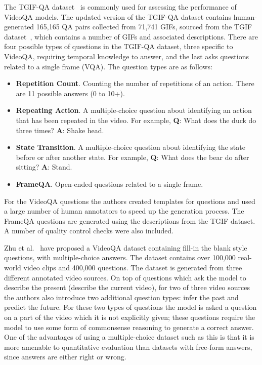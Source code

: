 \documentclass[../interim.tex]{subfiles}
\begin{document}
The TGIF-QA dataset~\cite{dataset:tgif-qa} is commonly used for assessing the performance of VideoQA models. The updated version of the TGIF-QA dataset contains human-generated 165,165 QA pairs collected from 71,741 GIFs, sourced from the TGIF dataset~\cite{dataset:tgif}, which contains a number of GIFs and associated descriptions. There are four possible types of questions in the TGIF-QA dataset, three specific to VideoQA, requiring temporal knowledge to answer, and the last asks questions related to a single frame (VQA). The question types are as follows:
\begin{itemize}
  \item \textbf{Repetition Count}. Counting the number of repetitions of an action. There are 11 possible answers (0 to 10+).

  \item \textbf{Repeating Action}. A multiple-choice question about identifying an action that has been repeated in the video. For example, \textbf{Q}: What does the duck do three times? \textbf{A}: Shake head.

  \item \textbf{State Transition}. A multiple-choice question about identifying the state before or after another state. For example, \textbf{Q}: What does the bear do after sitting? \textbf{A}: Stand.

  \item \textbf{FrameQA}. Open-ended questions related to a single frame.
\end{itemize}

For the VideoQA questions the authors created templates for questions and used a large number of human annotators to speed up the generation process. The FrameQA questions are generated using the descriptions from the TGIF dataset. A number of quality control checks were also included.

Zhu et al.~\cite{dataset:zhu} have proposed a VideoQA dataset containing fill-in the blank style questions, with multiple-choice answers. The dataset contains over 100,000 real-world video clips and 400,000 questions. The dataset is generated from three different annotated video sources. On top of questions which ask the model to describe the present (describe the current video), for two of three video sources the authors also introduce two additional question types: infer the past and predict the future. For these two types of questions the model is asked a question on a part of the video which it is not explicitly given; these questions require the model to use some form of commonsense reasoning to generate a correct answer. One of the advantages of using a multiple-choice dataset such as this is that it is more amenable to quantitative evaluation than datasets with free-form answers, since answers are either right or wrong.
\end{document}
